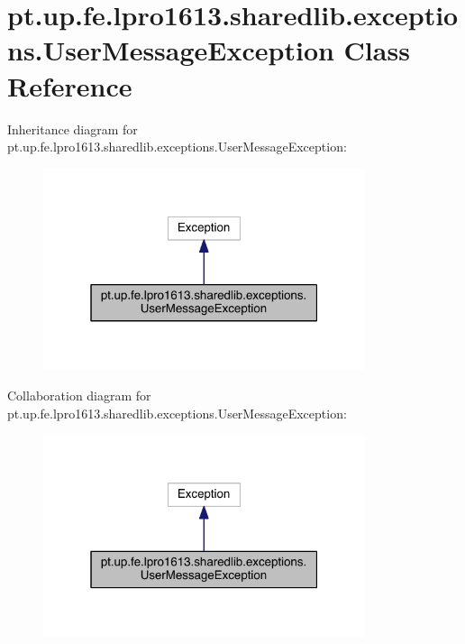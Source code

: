 \hypertarget{classpt_1_1up_1_1fe_1_1lpro1613_1_1sharedlib_1_1exceptions_1_1_user_message_exception}{}\section{pt.\+up.\+fe.\+lpro1613.\+sharedlib.\+exceptions.\+User\+Message\+Exception Class Reference}
\label{classpt_1_1up_1_1fe_1_1lpro1613_1_1sharedlib_1_1exceptions_1_1_user_message_exception}


Inheritance diagram for pt.\+up.\+fe.\+lpro1613.\+sharedlib.\+exceptions.\+User\+Message\+Exception\+:
\nopagebreak
\begin{figure}[H]
\begin{center}
\leavevmode
\includegraphics[width=268pt]{classpt_1_1up_1_1fe_1_1lpro1613_1_1sharedlib_1_1exceptions_1_1_user_message_exception__inherit__graph}
\end{center}
\end{figure}


Collaboration diagram for pt.\+up.\+fe.\+lpro1613.\+sharedlib.\+exceptions.\+User\+Message\+Exception\+:
\nopagebreak
\begin{figure}[H]
\begin{center}
\leavevmode
\includegraphics[width=268pt]{classpt_1_1up_1_1fe_1_1lpro1613_1_1sharedlib_1_1exceptions_1_1_user_message_exception__coll__graph}
\end{center}
\end{figure}
